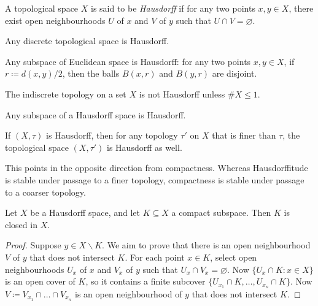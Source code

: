 
\begin{dfn}
	A topological space $X$ is said to be \emph{Hausdorff} if for any two points $x,y\in X$, there exist open neighbourhoods $U$ of $x$ and $V$ of $y$ such that $U\cap V=\varnothing$.
\end{dfn}

\begin{exm}
	Any discrete topological space is Hausdorff.
\end{exm}

\begin{exm}
	Any subspace of Euclidean space is Hausdorff:
	for any two points $x,y\in X$, if $r\coloneq d(x,y)/2$, then the balls $B(x,r)$ and $B(y,r)$ are disjoint.
\end{exm}

\begin{ctrexm}
	The indiscrete topology on a set $X$ is not Hausdorff unless $\# X\leq 1$.
\end{ctrexm}

\begin{exm}
	Any subspace of a Hausdorff space is Hausdorff.
\end{exm}

\begin{exm}
	If $(X,\tau)$ is Hausdorff, then for any topology $\tau'$ on $X$ that is finer than $\tau$, the topological space $(X,\tau')$ is Hausdorff as well.
\end{exm}

This points in the opposite direction from compactness.
Whereas Hausdorffitude is stable under passage to a finer topology,
compactness is stable under passage to a coarser topology.

\begin{lem}
	Let $X$ be a Hausdorff space, and let $K\subseteq X$ a compact subspace.
	Then $K$ is closed in $X$.
\end{lem}

\begin{proof}
	Suppose $y\in X \smallsetminus K$.
	We aim to prove that there is an open neighbourhood $V$ of $y$ that does not intersect $K$.
	For each point $x\in K$, select open neighbourhoods $U_x$ of $x$ and $V_x$ of $y$ such that $U_x\cap V_x=\varnothing$.
	Now $\{U_x\cap K : x\in X\}$ is an open cover of $K$, so it contains a finite subcover $\{U_{x_1}\cap K,\dots,U_{x_n}\cap K\}$.
	Now $V\coloneq V_{x_1}\cap\dots\cap V_{x_n}$ is an open neighbourhood of $y$ that does not intersect $K$. 
\end{proof}


